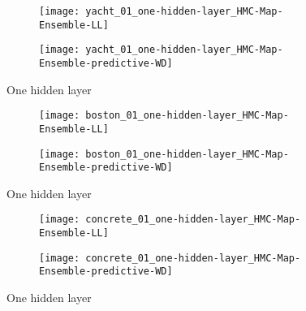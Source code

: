 \documentclass[../thesis.tex]{subfiles}
\begin{document}
\begin{figure}
    \centering
    \begin{subfigure}{0.49\textwidth}
        \texttt{[image: yacht\_01\_one-hidden-layer\_HMC-Map-Ensemble-LL]} 
    \end{subfigure}
    \begin{subfigure}{0.49\textwidth}
        \texttt{[image: yacht\_01\_one-hidden-layer\_HMC-Map-Ensemble-predictive-WD]} 
    \end{subfigure}
    \caption{One hidden layer}
    \label{fig:yacht_hmc_comparison_one-hidden-layer_nll}
\end{figure}

\begin{figure}
    \centering
    \begin{subfigure}{0.49\textwidth}
        \texttt{[image: boston\_01\_one-hidden-layer\_HMC-Map-Ensemble-LL]} 
    \end{subfigure}
    \begin{subfigure}{0.49\textwidth}
        \texttt{[image: boston\_01\_one-hidden-layer\_HMC-Map-Ensemble-predictive-WD]} 
    \end{subfigure}
    \caption{One hidden layer}
    \label{fig:Boston_hmc_comparison_nll}
\end{figure}

\begin{figure}
    \centering
    \begin{subfigure}{0.49\textwidth}
        \texttt{[image: concrete\_01\_one-hidden-layer\_HMC-Map-Ensemble-LL]} 
    \end{subfigure}
    \begin{subfigure}{0.49\textwidth}
        \texttt{[image: concrete\_01\_one-hidden-layer\_HMC-Map-Ensemble-predictive-WD]} 
    \end{subfigure}
    \caption{One hidden layer}
    \label{fig:concrete_hmc_comparison_nll}
\end{figure}
\end{document}
